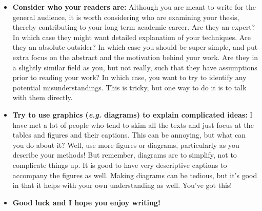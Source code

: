 \begin{itemize}
    \item \textbf{Consider who your readers are:} Although you are meant to write for the general audience, it is worth considering who are examining your thesis, thereby contributing to your long term academic career. Are they an expert? In which case they might want detailed explanation of your techniques. Are they an absolute outsider? In which case you should be super simple, and put extra focus on the abstract and the motivation behind your work. Are they in a slightly similar field as you, but not really, such that they have assumptions prior to reading your work? In which case, you want to try to identify any potential misunderstandings. This is tricky, but one way to do it is to talk with them directly.  
    \item \textbf{Try to use graphics (\textit{e.g.} diagrams) to explain complicated ideas:} I have met a lot of people who tend to skim all the texts and just focus at the tables and figures and their captions. This can be annoying, but what can you do about it? Well, use more figures or diagrams, particularly as you describe your methods! But remember, diagrams are to simplify, not to complicate things up. It is good to have very descriptive captions to accompany the figures as well. Making diagrams can be tedious, but it's good in that it helps with your own understanding as well. You've got this!
    \item \textbf{Good luck and I hope you enjoy writing!}
\end{itemize}